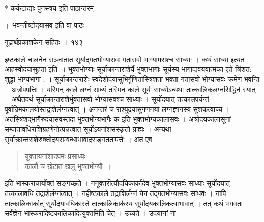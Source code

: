 \documentclass[11pt, openany]{book}
\begin{document}
\begin{center}
* कर्कटाद्याः पुनस्त्रय इति पाठान्तरम्।

+ भवन्तीष्टोदयासव इति वा पाठः।
\end{center}



\newpage

 \hspace{3cm} गूढार्थप्रकाशकेन सहितः~। \hfill १४३
\vspace{1cm}

\begin{sloppypar}
 इष्टकाले चालनेन सञ्जातात सूर्याद्गतभोग्यासवः गतासवो भाग्यामसश्च साध्या: । कथं साध्या इत्यत आह\textendash स्वोदयासुहता इति~। भुक्तभोग्याः सूर्याक्रान्तराशेर्ये भुक्तभागाः सूर्यस्य भागाद्यवयवात्मका एते त्रिंशत: शुद्धा भाग्यभागा : । सूर्याक्रान्तराशेः स्वदेशोदयासुभिर्गुणितास्त्रिंशता भक्ता गतासवो भोग्यासवः क्रमेण भवन्ति । अत्रोपपत्तिः । यस्मिन् काले लग्नं साध्यं तस्मिन काले सूर्यः साध्योऽन्यथा तात्कालिकलग्नसिद्धिर्न स्यात् । अथैतदर्थ सूर्याक्रान्तराशेर्भुक्तासवो भोग्यासवश्च साध्याः । सूर्योदयात् तत्कालपर्यन्तं पूर्वाग्रिमकालयोस्तद्राशेर्लग्नत्वात् । अनन्तरं च राश्युदयासुगणनया लग्नज्ञानस्य सुशकत्वाच्च । अतस्त्रिंशद्भागैरुदयासवस्तदा भुक्तभोग्यभागैः क इति भुक्तभोग्यकालासवः । अत्रोदयकालासूनां सम्पातावधिराशिग्रहणेनोत्पन्नत्वात् सूर्योऽयनांशसंस्कृतो ग्राह्यः । अन्यथा सृर्याक्रान्तराशेरुक्तोदयसम्बन्धाभावादसङ्गततापत्तेः । अत एव
\end{sloppypar}


\begin{quote}
 {\qt युक्तायनांशादपमः प्रसाध्यः\\
कालौ च खेटात खलु भुक्तभोग्यौ~।}
\end{quote}

\begin{sloppypar}
इति भास्कराचार्योक्तं सङ्गच्छते । ननूक्तरीत्यौदयिकार्कादेव भुक्तभोग्यासवः साध्याः सूर्योदयात् तत्कालावधि तद्राशेर्लग्नत्वात् । नहीष्टकाले तद्राशिर्लग्नं येन तद्गतभोग्यासवः साधवः । नापि तात्कालिकार्कात् सूर्योदयावधिकास्ते तात्कालिकार्कस्य सूर्योदयकालिकत्वाभावात् । तत् कथं भगवता सर्वज्ञेन भास्करादिष्टकालिकादित्युक्तमिति चेत् । उच्यते । उदयानां ना\textendash
\end{sloppypar}


\newpage
\end{document}

